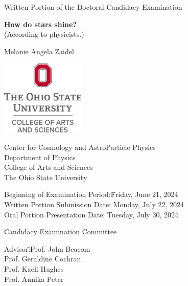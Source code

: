 \documentclass[12pt]{article}
\begin{document}
\begin{center}
\thispagestyle{empty}
\large Written Portion of the Doctoral Candidacy Examination

\vspace*{0.75in}
\Huge \textbf{How do stars shine?}\\
\Large (According to physicists.)

\vspace{0.5in}

\LARGE Melanie Angela Zaidel

\vspace{0.5in}

\includegraphics[width=0.3\textwidth]{Bonus Graphics/ASC-Stacked-RGBHEX.jpg}

\vfill

\Large Center for Cosmology and AstroParticle Physics \\
\Large Department of Physics \\
\Large College of Arts and Sciences \\
\Large The Ohio State University

\vspace{0.25in}
\begin{center}
\begin{minipage}{0.25\textwidth}
\begin{flushleft}
\begin{tabbing}
Beginning of Examination Period:\quad \= Friday, June 21, 2024 \\
Written Portion Submission Date: \> Monday, July 22, 2024 \\
Oral Portion Presentation Date: \> Tuesday, July 30, 2024 \\
\end{tabbing}
\end{flushleft}
\end{minipage}
\end{center}
\vfill

\Large Candidacy Examination Committee

\end{center}

\begin{center}
\begin{minipage}{0.5\textwidth}
\begin{flushleft}
\begin{tabbing}
\large Advisor:\quad \= \large Prof. John Beacom \\
\> \large Prof. Geraldine Cochran \\
\> \large Prof. Kaeli Hughes \\
\> \large Prof. Annika Peter
\end{tabbing}
\end{flushleft}
\end{minipage}
\end{center}
\pagebreak
\end{document}
